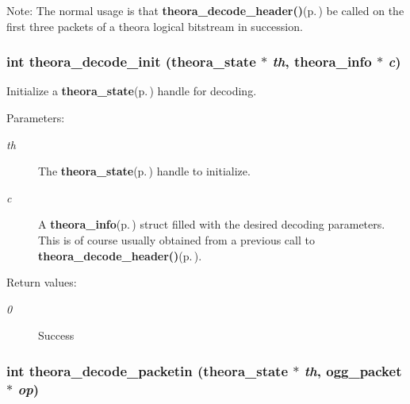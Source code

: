 \begin{Desc}
\item[Note:]The normal usage is that {\bf theora\_\-decode\_\-header()}{\rm (p.\,\pageref{theora_8h_41a60c67649c41ae88278d777f89ee3f})} be called on the first three packets of a theora logical bitstream in succession. \end{Desc}
\subsubsection{\setlength{\rightskip}{0pt plus 5cm}int theora\_\-decode\_\-init ({\bf theora\_\-state} $\ast$ {\em th}, {\bf theora\_\-info} $\ast$ {\em c})}\label{theora_8h_a9f81159ae039353cac6076a59fba871}


Initialize a {\bf theora\_\-state}{\rm (p.\,\pageref{structtheora__state})} handle for decoding. 

\begin{Desc}
\item[Parameters:]
\begin{description}
\item[{\em th}]The {\bf theora\_\-state}{\rm (p.\,\pageref{structtheora__state})} handle to initialize. \item[{\em c}]A {\bf theora\_\-info}{\rm (p.\,\pageref{structtheora__info})} struct filled with the desired decoding parameters. This is of course usually obtained from a previous call to {\bf theora\_\-decode\_\-header()}{\rm (p.\,\pageref{theora_8h_41a60c67649c41ae88278d777f89ee3f})}. \end{description}
\end{Desc}
\begin{Desc}
\item[Return values:]
\begin{description}
\item[{\em 0}]Success \end{description}
\end{Desc}
\subsubsection{\setlength{\rightskip}{0pt plus 5cm}int theora\_\-decode\_\-packetin ({\bf theora\_\-state} $\ast$ {\em th}, ogg\_\-packet $\ast$ {\em op})}\label{theora_8h_a67cbe3cc458aad10904c0cc78044fc5}



